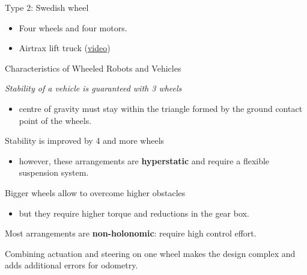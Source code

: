 \documentclass[compress]{beamer}
\begin{document}
\begin{frame}{Type 2: Swedish wheel}
{\begin{itemize}
    \item Four wheels and four motors.

        \begin{center}
        \end{center}

    \item Airtrax lift truck
  (\href{http://www.youtube.com/watch?v=IlmKcohyXG0}{video})
\end{itemize}

}
\end{frame}

\begin{frame}{Characteristics of Wheeled Robots and Vehicles}

\emph{Stability of a vehicle is guaranteed with 3 wheels}

\begin{itemize}
    \item centre of gravity must stay within the triangle formed by the ground
  contact point of the wheels.
\end{itemize}

Stability is improved by 4 and more wheels

\begin{itemize}
    \item however, these arrangements are \textbf{hyperstatic} and require a flexible
  suspension system.
\end{itemize}

\pause

Bigger wheels allow to overcome higher obstacles

\begin{itemize}
    \item but they require higher torque and reductions in the gear box.
\end{itemize}

\pause
Most arrangements are \textbf{non-holonomic}: require high control effort.

\pause
Combining actuation and steering on one wheel makes the design complex
and adds additional errors for odometry.

\end{frame}
\end{document}
